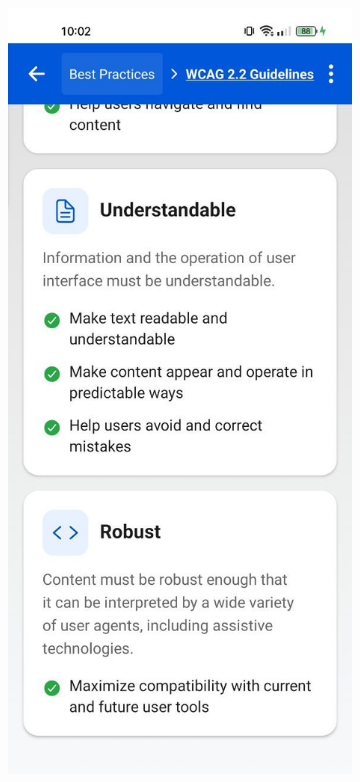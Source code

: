 \begin{enumerate}
\begin{itemize}
        \begin{figure}[ht]
            \centering
            \begin{subfigure}[b]{0.48\textwidth}
                \centering
                \includegraphics[width=\linewidth, alt={First part of the Semantic structure screen}]{img/semantics1.jpg}

\end{subfigure}
\end{figure}
\end{itemize}
\end{enumerate}
